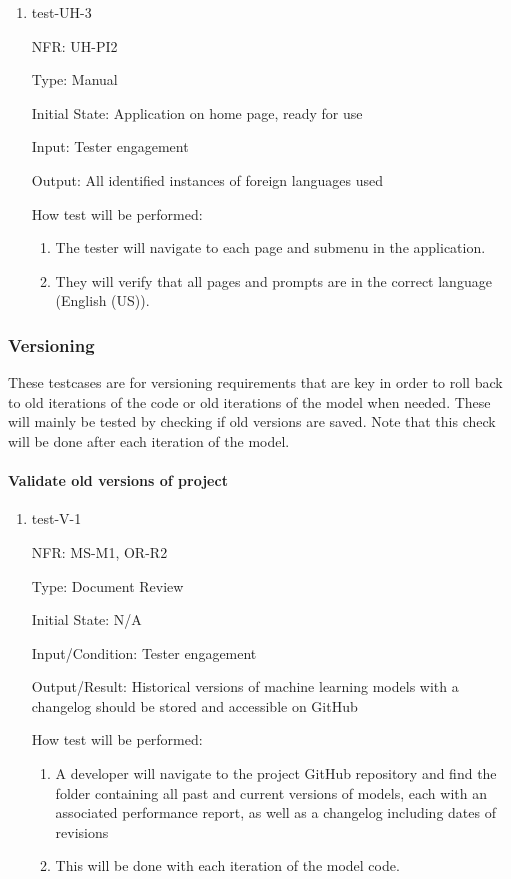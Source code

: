 \documentclass[12pt, titlepage]{article}
\begin{document}
\begin{enumerate}
  \item{test-UH-3}
  
  NFR: UH-PI2

  Type: Manual
            
  Initial State: Application on home page, ready for use
            
  Input: Tester engagement
            
  Output: All identified instances of foreign languages used
            
  How test will be performed: 
  \begin{enumerate}
    \item The tester will navigate to each page and submenu in the application.
    \item They will verify that all pages and prompts are in the correct language (English (US)).
  \end{enumerate}
  
  \end{enumerate}

\subsubsection{Versioning}
These testcases are for versioning requirements that are key in order 
to roll back to old iterations of the code or old iterations of the model 
when needed. These will mainly be tested by checking if old versions are saved. 
Note that this check will be done after each iteration of the model.

\paragraph{Validate old versions of project}
\begin{enumerate}
  \item{test-V-1}

  NFR: MS-M1, OR-R2
  
  Type: Document Review
            
  Initial State: N/A
            
  Input/Condition: Tester engagement
            
  Output/Result: Historical versions of machine learning models with a changelog 
  should be stored and accessible on GitHub
            
  How test will be performed: 
  \begin{enumerate}
    \item A developer will navigate to the project GitHub repository and find the 
    folder containing all past and current versions of models, each with an 
    associated performance report, as well as a changelog including dates of revisions
    \item This will be done with each iteration of the model code.
  \end{enumerate}
\end{enumerate}
\end{document}
